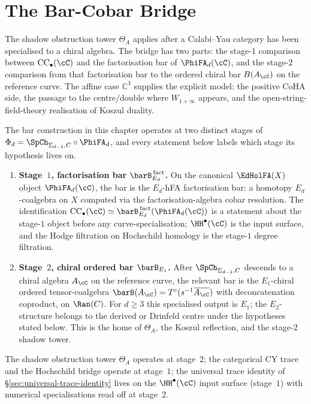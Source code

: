 \chapter{The Bar-Cobar Bridge}
\label{ch:bar-cobar-bridge}

The shadow obstruction tower $\Theta_A$ applies after a
Calabi--Yau category has been specialised to a chiral algebra. The bridge
has two parts: the stage-$1$ comparison between
$\mathrm{CC}_\bullet(\cC)$ and the factorisation bar of
$\PhiFA_d(\cC)$, and the stage-$2$ comparison from that factorisation bar
to the ordered chiral bar $B(A_\cC)$ on the reference curve. The affine
case $\mathbb{C}^3$ supplies the explicit model: the positive CoHA side,
the passage to the centre/double where $W_{1+\infty}$ appears, and the
open-string-field-theory realisation of Koszul duality.

The bar construction in this chapter operates at two distinct stages of $\Phi_d = \SpCh_{\Sigma_{d-1}, C} \circ \PhiFA_d$, and every statement below labels which stage its hypothesis lives on.
\begin{enumerate}[label=\textup{(\roman*)}]
\item \textbf{Stage~$1$, factorisation bar $\barB^{\,\mathrm{fact}}_{E_d}$.} On the canonical
$\EdHolFA(X)$ object $\PhiFA_d(\cC)$, the bar is the $E_d$-hFA
factorisation bar: a homotopy $E_d$-coalgebra on $X$ computed via the
factorisation-algebra cobar resolution. The identification
$\mathrm{CC}_\bullet(\cC) \simeq \barB^{\,\mathrm{fact}}_{E_d}(\PhiFA_d(\cC))$
is a statement about the stage-$1$ object before any curve-specialisation;
$\HH^\bullet(\cC)$ is the input surface, and the Hodge filtration on
Hochschild homology is the stage-$1$ degree filtration.
\item \textbf{Stage~$2$, chiral ordered bar $\barB_{E_1}$.} After
$\SpCh_{\Sigma_{d-1}, C}$ descends to a chiral algebra
$A_\cC$ on the reference curve, the relevant bar is the
$E_1$-chiral ordered tensor-coalgebra
$\barB(A_\cC) = T^c(s^{-1} \overline{A_\cC})$ with deconcatenation
coproduct, on $\Ran(C)$. For $d \geq 3$ this specialised output is
$E_1$; the $E_2$-structure belongs to the derived or Drinfeld centre under
the hypotheses stated below. This is the home of $\Theta_A$, the
Koszul reflection, and the stage-$2$ shadow tower.
\end{enumerate}
The shadow obstruction tower $\Theta_A$ operates at stage~$2$; the
categorical CY trace and the Hochschild bridge operate at stage~$1$; the
universal trace identity of \S\ref{sec:universal-trace-identity} lives
on the $\HH^\bullet(\cC)$ input surface (stage~$1$) with numerical
specialisations read off at stage~$2$.


